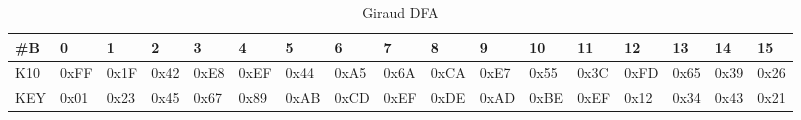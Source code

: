 
\begin{table*}[ht]
	\centering
	\begin{tabularx}{\textwidth}{XXXXXXXXXXXXXXXXX}
		\#B & 0 & 1 & 2 & 3 & 4 & 5 & 6 & 7 & 8 & 9 & 10 & 11 & 12 & 13 & 14 & 15 \\ \hline
		K10 & 0xFF & 0x1F & \cellcolor{red!25}0x42 & 0xE8 & 0xEF & \cellcolor{red!25}0x44 & 0xA5 & 0x6A & 0xCA & 0xE7 & 0x55 & 0x3C & 0xFD & 0x65 & 0x39 & 0x26 \\
		KEY & 0x01 & 0x23 & 0x45 & 0x67 & 0x89 & 0xAB & 0xCD & 0xEF & 0xDE & 0xAD & 0xBE & 0xEF & 0x12 & 0x34 & 0x43 & 0x21
	\end{tabularx}
	\caption{Giraud DFA}
	\label{table_giraud}
\end{table*}
